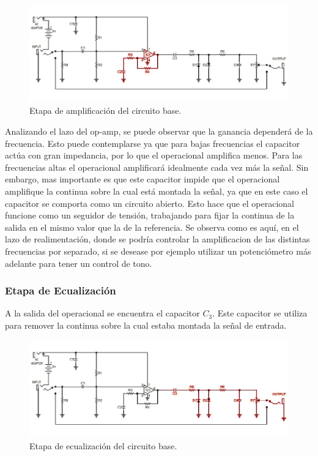 \begin{figure}[H]
	\centering
	\includegraphics[width=1\textwidth, trim={0 0 0 0}, clip]{Ejercicio5/Imagenes/Circuito_base/circuito_base_amplificacion.png}
	\caption{Etapa de amplificación del circuito base.}
	\label{fig:circuito_base_amplificacion}
\end{figure}

Analizando el lazo del op-amp, se puede observar que la ganancia dependerá de la frecuencia.
Esto puede contemplarse ya que para bajas frecuencias el capacitor actúa con gran impedancia, por lo que el operacional amplifica menos. Para las frecuencias altas el operacional amplificará idealmente cada vez más la señal. Sin embargo, mas importante es que este capacitor impide que el operacional amplifique la continua sobre la cual está montada la señal, ya que en este caso el capacitor se comporta como un circuito abierto. Esto hace que el operacional funcione como un seguidor de tensión, trabajando para fijar la continua de la salida en el mismo valor que la de la referencia. Se observa como es aquí, en el lazo de realimentación, donde se podría controlar la amplificacion de las distintas frecuencias por separado, si se desease por ejemplo utilizar un potenciómetro más adelante para tener un control de tono.

\subsubsection{Etapa de Ecualización}

A la salida del operacional se encuentra el capacitor $C_3$. Este capacitor se utiliza para remover la continua sobre la cual estaba montada la señal de entrada.

\begin{figure}[H]
	\centering
	\includegraphics[width=1\textwidth, trim={0 0 0 0}, clip]{Ejercicio5/Imagenes/Circuito_base/circuito_base_ecualizacion.png}
	\caption{Etapa de ecualización del circuito base.}
	\label{fig:circuito_base_ecualizacion}
\end{figure}

